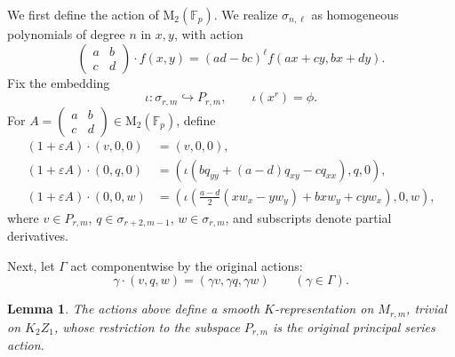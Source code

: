 \documentclass[10pt]{article}
\theoremstyle{plain}
\newtheorem{lemma}[theorem]{Lemma}
\theoremstyle{definition}
\theoremstyle{remark}
\newcommand{\Fp}{\mathbb{F}_p}
\newcommand{\Mat}{\mathrm{M}}
\begin{document}
We first define the action of $\Mat_2(\Fp)$. We realize $\sigma_{n,\ell}$ as homogeneous polynomials of degree $n$ in $x,y$, with action
\[
\begin{pmatrix}a&b\\c&d\end{pmatrix}\cdot f(x,y)
=(ad-bc)^\ell f(ax+cy,bx+dy).
\]
Fix the embedding
\[
\iota:\sigma_{r,m}\hookrightarrow P_{r,m},\qquad \iota(x^r)=\phi.
\]
For $A=\begin{pmatrix}a&b\\c&d\end{pmatrix}\in\Mat_2(\Fp)$, define
\begin{align}
(1+\varepsilon A)\cdot(v,0,0)&=(v,0,0),\label{eq:module-M-action-P}\\
(1+\varepsilon A)\cdot(0,q,0)
&=\left(\iota\!\left(bq_{yy}+(a-d)q_{xy}-cq_{xx}\right),q,0\right),\label{eq:module-M-action-q}\\
(1+\varepsilon A)\cdot(0,0,w)
&=\left(\iota\!\left(\frac{a-d}{2}(xw_x-yw_y)+bxw_y+cyw_x\right),0,w\right),\label{eq:module-M-action-w}
\end{align}
where $v\in P_{r,m}$, $q\in\sigma_{r+2,m-1}$, $w\in\sigma_{r,m}$, and subscripts denote partial derivatives.

Next, let $\Gamma$ act componentwise by the original actions:
\[
\gamma\cdot(v,q,w)=(\gamma v,\gamma q,\gamma w)
\qquad(\gamma\in\Gamma).
\]
\begin{lemma}\label{lem:module-M-well-defined}
The actions above define a smooth $K$-representation on $M_{r,m}$, trivial on $K_2Z_1$, whose restriction to the subspace $P_{r,m}$ is the original principal series action.
\end{lemma}
\end{document}
